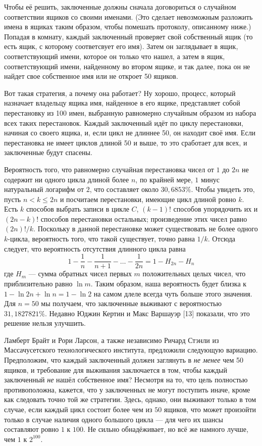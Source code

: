 Чтобы её решить, заключенные должны сначала договориться о случайном соответствии ящиков со своими именами.
(Это сделает невозможным разложить имена в ящиках таким образом, чтобы помешать протоколу, описанному ниже.)
Попадая в комнату, каждый заключенный проверяет свой собственный ящик (то есть ящик, с которому соответсвует его имя).
Затем он заглядывает в ящик, соответствующий имени, которое он только что нашел, а затем в ящик, соответствующий имени, найденному во втором ящике, и так далее, пока он не найдет свое собственное имя или не откроет 50 ящиков.

Вот такая стратегия, а почему она работает?
Ну хорошо, процесс, который назначает владельцу ящика имя, найденное в его ящике, представляет собой перестановку из 100 имен, выбранную равномерно случайным образом из набора всех таких перестановок.
Каждый заключенный идёт по циклу перестановки, начиная со своего ящика, и, если цикл не длиннее 50, он находит своё имя.
Если перестановка не имеет циклов длиной 50 и выше, то это сработает для всех, и заключенные будут спасены.

Вероятность того, что равномерно случайная перестановка чисел от $1$ до $2n$ не содержит ни одного цикла длиной более $n$, по крайней мере, $1$ минус натуральный логарифм от $2$, что составляет около $30,6853\%$.
Чтобы увидеть это, пусть $n < k \le 2n$ и посчитаем перестановки, имеющие цикл длиной ровно $k$.
Есть $k$ способов выбрать записи в цикле $C$, $(k - 1)!$ способов упорядочить их и $(2n - k)!$ способов перестановки остальных; произведение этих чисел равно $(2n)!/k$.
Поскольку в данной перестановке может существовать не более одного $k$-цикла, вероятность того, что такой существует, точно равна $1/k$.
Отсюда следует, что вероятность отсутствия длинного цикла равна
\[1-\frac{1}{n}-\frac{1}{n+1}-\dots-\frac{1}{2n}=1-H_{2n}-H_n\]
где $H_m$ --- сумма обратных чисел первых $m$ положительных целых чисел, что приблизительно равно $\ln m$.
Таким образом, наша вероятность будет близка к $1 - \ln 2n + \ln n = 1 - \ln 2$ на самом длеле всегда чуть больше этого значения.
Для $n = 50$ мы получаем, что заключенные выживают с вероятностью $31,1827821\%$.
Недавно Юджин  Кертин и Макс Варшауэр [13] показали, что это решение нельзя улучшить.

Ламберт Брайт и Рори Ларсон, а также независимо Ричард Стэнли из Массачусетского технологического института, предложили следующую вариацию.
Предположим, что каждый заключенный должен заглянуть в \emph{не менее} чем 50 ящиков, и требование для выживания заключается в том, чтобы каждый заключенный \emph{не} нашёл собственное имя?
Несмотря на то, что цель полностью противоположна, кажется, что у заключенных не могут поступить иначе, кроме как следовать точно той же стратегии.
Здесь, однако, они выживают только в том случае, если каждый цикл состоит более чем из $50$ ящиков, что может произойти только в случае наличия одного большого цикла --- для чего их шансы составляют ровно $1$ к $100$.
Не сильно обнадёживает, но всё же намного лучше, чем $1$ к $2^{100}$.

